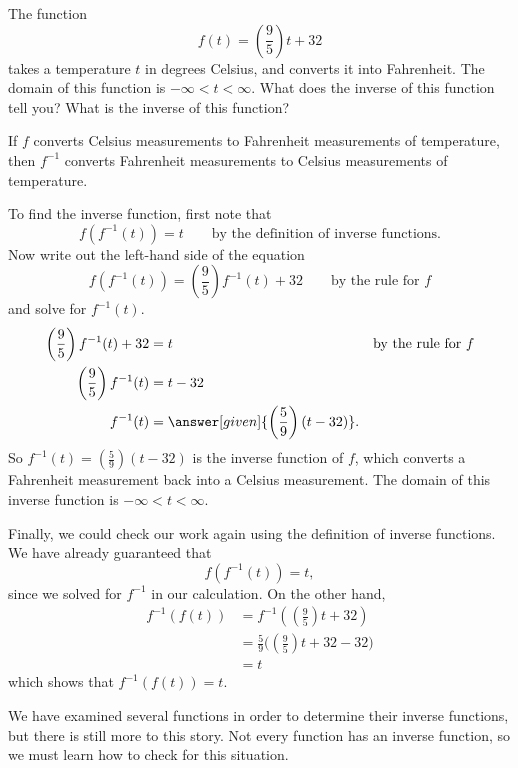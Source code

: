 \documentclass{ximera}
\begin{document}
\begin{example}
  The function
  \[
  f(t) = \left(\frac{9}{5}\right) t + 32
  \]	
  takes a temperature $t$ in degrees Celsius, and converts it into Fahrenheit.  
  The domain of this function is $-\infty < t < \infty$.  What does the inverse 
  of this function tell you? What is the inverse of this function?

  \begin{explanation}
    If $f$ converts Celsius measurements to Fahrenheit measurements of
    temperature, then $f^{-1}$ converts Fahrenheit measurements to
    Celsius measurements of temperature.
    
    To find the inverse function, first note that 
    \[
    f(f^{-1}(t)) = t \qquad \text{by the definition of inverse
      functions.}
    \]
    Now write out the left-hand side of the equation
    \[
    f(f^{-1}(t)) = \left(\frac{9}{5}\right) f^{-1}(t)+32\qquad\text{by the rule for $f$}
    \]
    and solve for $f^{-1}(t)$.
    \begin{align*}
      \left(\frac{9}{5}\right) f^{-1}(t)+32 &= t &&\text{by the rule for $f$}\\
      \left(\frac{9}{5}\right) f^{-1}(t)&= t -32\\
      f^{-1}(t) &= \answer[given]{\left(\frac{5}{9}\right)(t - 32)}.
    \end{align*}
    So $f^{-1}(t) = \left(\frac{5}{9}\right)(t - 32)$ is the inverse
    function of $f$, which converts a Fahrenheit measurement back into
    a Celsius measurement.  The domain of this inverse function is $-\infty < t <\infty$.
    
    Finally, we could check our work again using the definition of inverse functions.
     We have already guaranteed that
    \[
    f(f^{-1}(t)) = t,
    \]
    since we solved for $f^{-1}$ in our calculation.  On the other hand, 
      \begin{align*}
     f^{-1}(f(t))&=f^{-1} \left(\left(\frac{9}{5}\right)t+32\right) \\
     &= \frac{5}{9}\Big( \left(\frac{9}{5}\right)t+32-32\Big)\\
     &=t
       \end{align*}
which shows that $f^{-1}(f(t)) = t$.
  \end{explanation}
\end{example}



We have examined several functions in order to determine their inverse
functions, but there is still more to this story.  Not every function
has an inverse function, so we must learn how to check for this
situation.
\end{document}
